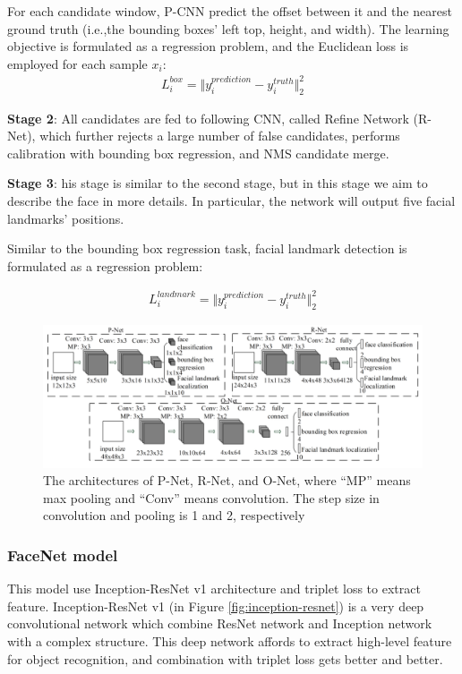 \documentclass[journal, twocolumn]{IEEEtran}
\begin{document}
For each candidate window, P-CNN predict the offset between it and the nearest ground truth (i.e.,the bounding boxes’ left top, height, and width). The learning objective is formulated as a regression problem, and  the Euclidean loss is employed for each sample $x_i$:
\begin{align}
	L_i^{box} = \Vert y_i^{prediction} - y_i^{truth} \Vert _2^2
\end{align}
		
\textbf{Stage 2}: All candidates are fed to following CNN, called Refine Network (R-Net), which further rejects a large number of false candidates, performs calibration with bounding box regression, and NMS candidate merge.

\textbf{Stage 3}: his stage is similar to the second stage, but in this stage we aim to describe the face in more details. In particular, the network will output five facial landmarks’ positions.

Similar to the bounding box regression task, facial landmark detection is formulated as a regression problem: 

\begin{align}
	L_i^{landmark} = \Vert y_i^{prediction} - y_i^{truth} \Vert _2^2
\end{align}

\begin{figure}
    \centering
    \includegraphics[width=1\linewidth]{img/mtcnn_arch.png}
	\caption{The architectures of P-Net, R-Net, and O-Net, where “MP” means max pooling and “Conv” means convolution. The step size in convolution and pooling
is 1 and 2, respectively}\label{fig:mtcnn-arch}
\end{figure}


\subsubsection{FaceNet model} 
This model use Inception-ResNet v1 architecture \cite{ref:in-res} and triplet loss to extract feature. Inception-ResNet v1 (in Figure \ref{fig:inception-resnet}) is a very deep convolutional network which combine ResNet network and Inception network with a complex structure. This deep network affords to extract high-level feature for object recognition, and combination with triplet loss gets better and better. 
\end{document}
